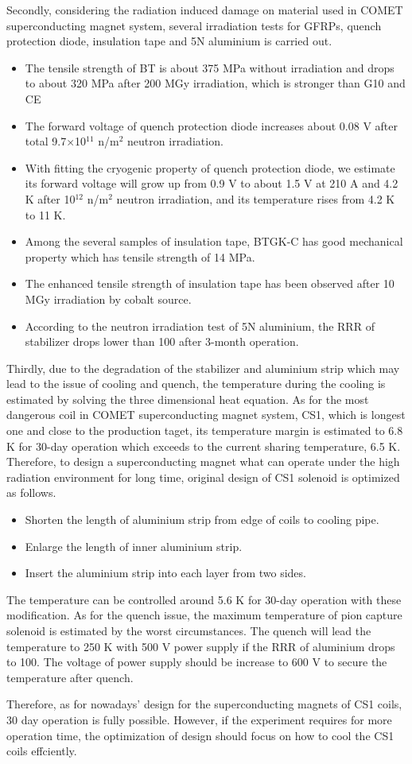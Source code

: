 Secondly, considering the radiation induced damage on material used in COMET superconducting magnet system, several irradiation tests for GFRPs, quench protection diode, insulation tape and 5N aluminium is carried out.
\begin{itemize}
 \setlength{\itemsep}{-5pt}
 \item The tensile strength of BT is about 375 MPa without irradiation and drops to about 320 MPa after 200 MGy irradiation, which is stronger than G10 and CE
 \item The forward voltage of quench protection diode increases about 0.08 V after total 9.7$\times$10$^{11}$ n/m$^2$ neutron irradiation.
 \item With fitting the cryogenic property of quench protection diode, we estimate its forward voltage will grow up from 0.9 V to about 1.5 V at 210 A and 4.2 K after 10$^{12}$ n/m$^2$ neutron irradiation, and its temperature rises from 4.2 K to 11 K.
 \item Among the several samples of insulation tape, BTGK-C has good mechanical property which has tensile strength of 14 MPa.
 \item The enhanced tensile strength of insulation tape has been observed after 10 MGy irradiation by cobalt source.
 \item According to the neutron irradiation test of 5N aluminium, the RRR of stabilizer drops lower than 100 after 3-month operation.
\end{itemize}

Thirdly, due to the degradation of the stabilizer and aluminium strip which may lead to the issue of cooling and quench, the temperature during the cooling is estimated by solving the three dimensional heat equation.
As for the most dangerous coil in COMET superconducting magnet system, CS1, which is longest one and close to the production taget, its temperature margin is estimated to 6.8 K for 30-day operation which exceeds to the current sharing temperature, 6.5 K.
Therefore, to design a superconducting magnet what can operate under the high radiation environment for long time, original design of CS1 solenoid is optimized as follows.
\begin{itemize}
 \setlength{\itemsep}{-5pt}
 \item Shorten the length of aluminium strip from edge of coils to cooling pipe.
 \item Enlarge the length of inner aluminium strip.
 \item Insert the aluminium strip into each layer from two sides.
\end{itemize}
The temperature can be controlled around 5.6 K for 30-day operation with these modification.
As for the quench issue, the maximum temperature of pion capture solenoid is estimated by the worst circumstances.
The quench will lead the temperature to 250 K with 500 V power supply if the RRR of aluminium drops to 100.
The voltage of power supply should be increase to 600 V to secure the temperature after quench.

Therefore, as for nowadays' design for the superconducting magnets of CS1 coils, 30 day operation is fully possible.
However, if the experiment requires for more operation time, the optimization of design should focus on how to cool the CS1 coils effciently.
